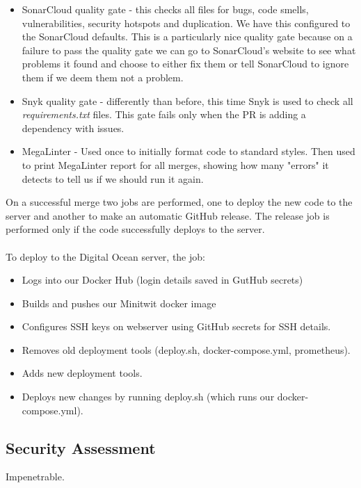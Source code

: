 \begin{itemize}
    \item SonarCloud quality gate - this checks all files for bugs, code smells, vulnerabilities, security hotspots and duplication. We have this configured to the SonarCloud defaults. This is a particularly nice quality gate because on a failure to pass the quality gate we can go to SonarCloud's website to see what problems it found and choose to either fix them or tell SonarCloud to ignore them if we deem them not a problem.
    \item Snyk quality gate - differently than before, this time Snyk is used to check all \textit{requirements.txt} files. This gate fails only when the PR is adding a dependency with issues.
    \item MegaLinter - Used once to initially format code to standard styles. Then used to print MegaLinter report for all merges, showing how many "errors" it detects to tell us if we should run it again.
\end{itemize}

On a successful merge two jobs are performed, one to deploy the new code to the server and another to make an automatic GitHub release. The release job is performed only if the code successfully deploys to the server.
\\\\
To deploy to the Digital Ocean server, the job:

\begin{itemize}
    \item Logs into our Docker Hub (login details saved in GutHub secrets)
    \item Builds and pushes our Minitwit docker image %
    \item Configures SSH keys on webserver using GitHub secrets for SSH details.
    \item Removes old deployment tools (deploy.sh, docker-compose.yml, prometheus).
    \item Adds new deployment tools.
    \item Deploys new changes by running deploy.sh (which runs our docker-compose.yml).
\end{itemize}

\subsection{Security Assessment}

Impenetrable.


